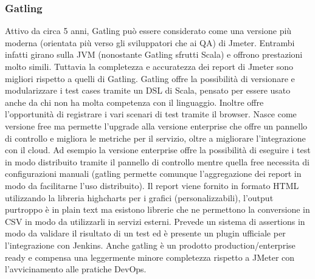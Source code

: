 \subsubsection{Gatling}
Attivo da circa 5 anni, Gatling può essere considerato come una versione più moderna (orientata più verso gli sviluppatori che ai QA) di Jmeter. Entrambi infatti girano sulla JVM (nonostante Gatling sfrutti Scala) e offrono prestazioni molto simili. Tuttavia la completezza e accuratezza dei report di Jmeter sono migliori rispetto a quelli di Gatling.
Gatling offre la possibilità di versionare e modularizzare i test cases tramite un DSL di Scala, pensato per essere usato anche da chi non ha molta competenza con il linguaggio.
Inoltre offre l'opportunità di registrare i vari scenari di test tramite il browser.
Nasce come versione free ma permette l’upgrade alla versione enterprise che offre un pannello di controllo e migliora le metriche per il servizio, oltre a migliorare l’integrazione con il cloud. Ad esempio la versione enterprise offre la possibilità di eseguire i test in modo distribuito tramite il pannello di controllo mentre quella free necessita di configurazioni manuali (gatling permette comunque l’aggregazione dei report in modo da facilitarne l’uso distribuito).
Il report viene fornito in formato HTML utilizzando la libreria highcharts per i grafici (personalizzabili), l’output purtroppo è in plain text ma esistono librerie che ne permettono la conversione in CSV in modo da utilizzarli in servizi esterni.
Prevede un sistema di assertions in modo da validare il risultato di un test ed è presente un plugin ufficiale per l’integrazione con Jenkins.
Anche gatling è un prodotto production/enterprise ready e compensa una leggermente minore completezza rispetto a JMeter con l’avvicinamento alle pratiche DevOps.
